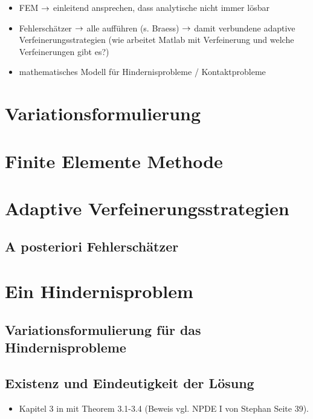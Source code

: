 \label{sec:Grundlagen}

\begin{itemize}
\item FEM $\rightarrow$ einleitend ansprechen, dass analytische nicht immer lösbar
\item Fehlerschätzer $\rightarrow$ alle aufführen (s. Braess) $\rightarrow$ damit verbundene adaptive Verfeinerungsstrategien (wie arbeitet Matlab mit Verfeinerung und welche Verfeinerungen gibt es?)
\item mathematisches Modell für Hindernisprobleme / Kontaktprobleme
\end{itemize}

\section{Variationsformulierung}

\section{Finite Elemente Methode}

\section{Adaptive Verfeinerungsstrategien}

\subsection{A posteriori Fehlerschätzer}

\section{Ein Hindernisproblem}

\subsection{Variationsformulierung für das Hindernisprobleme}

\subsection{Existenz und Eindeutigkeit der Lösung}

\begin{itemize}
\item Kapitel 3 in \cite{KikOden} mit Theorem 3.1-3.4 (Beweis vgl. NPDE I von Stephan Seite 39).
\end{itemize}

